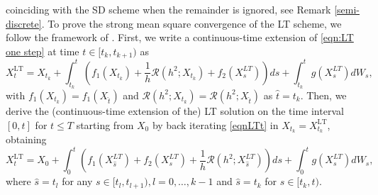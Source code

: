 \documentclass[a4paper,12pt]{article}
\numberwithin{equation}{section}
\theoremstyle{plain}
\theoremstyle{definition}
\begin{document}
\begin{appendix}
\begin{equation}
\end{equation} 
coinciding with the SD scheme \cite{halidias_semi-discrete_2012,stamatiou_numerical_2016,stamatiou_boundary_2018} when the remainder is ignored, see Remark \ref{semi-discrete}. 
To prove the strong mean square convergence of the LT scheme, we follow the framework of \cite{higham_strong_2002,stamatiou_boundary_2018}. First, we write a continuous-time extension of \eqref{eqn:LT one step} at time $t\in[t_k,t_{k+1})$ as 
\begin{equation}\label{eqnLTt}
    X^{\textrm{LT}}_{t}=X_{t_k}+\int_{t_k}^t\left(f_1(X_{t_k})+\frac{1}{h}\mathcal{R}(h^2;X_{t_k})+f_2(X^{LT}_s)\right)ds+\int_{t_k}^{t}g(X^{LT}_s)dW_s,
\end{equation} 
with $f_1(X_{t_k})=f_1(X_{\hat t})$ and $\mathcal{R}(h^2;X_{t_k})=\mathcal{R}(h^2;X_{\hat t})$ as $\hat t=t_k$. Then, we derive the (continuous-time extension of the) LT solution on the time interval $[0,t]$ for $t\leq T$ starting from $X_0$ by  back iterating \eqref{eqnLTt} in $X_{t_k}=X_{t_k}^\textrm{LT}$, obtaining
\begin{equation}\label{eqn:LT full step}
    X^{\textrm{LT}}_t=X_0+\int_0^t \left(f_1(X^{LT}_{\hat{s}})+f_2(X^{LT}_s)+\frac{1}{h}\mathcal{R}(h^2;X^{LT}_{\hat{s}})\right)ds+\int_0^t g(X^{LT}_s)dW_s,
\end{equation}
 where $\hat s=t_l$ for any $s\in [t_l,t_{l+1}), l=0,\ldots, k-1$ and $\hat s=t_k$ for $s\in[t_k,t)$.
 

\end{appendix}
\end{document}
